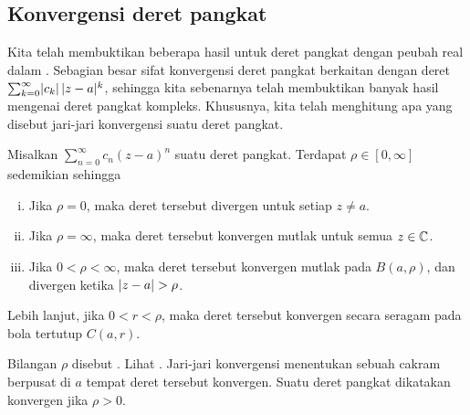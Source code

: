 \subsection{Konvergensi deret pangkat}

Kita telah membuktikan beberapa hasil untuk deret pangkat dengan peubah real dalam
.   Sebagian besar sifat
konvergensi deret pangkat berkaitan dengan deret
$\sum_{k=0}^\infty \lvert {c_k} \rvert \, \lvert {z-a} \rvert^k$,
sehingga kita sebenarnya telah membuktikan banyak hasil mengenai deret pangkat
kompleks.  Khususnya, kita telah menghitung apa yang disebut
jari-jari konvergensi suatu deret pangkat.

\begin{prop}
\pagebreak[2]
Misalkan $\sum_{n=0}^\infty c_n {(z-a)}^n$ suatu deret pangkat.
Terdapat $\rho \in [0,\infty]$ sedemikian sehingga
\begin{enumerate}[(i)]
\item Jika $\rho = 0$, maka deret tersebut divergen untuk setiap $z \neq a$.
\item Jika $\rho = \infty$, maka deret tersebut konvergen mutlak untuk semua $z \in {\mathbb{C}}$.
\item Jika $0 < \rho < \infty$, maka deret tersebut
konvergen mutlak pada $B(a,\rho)$,
dan divergen ketika $\lvert {z-a} \rvert > \rho$.
\end{enumerate}
Lebih lanjut, jika $0 < r < \rho$, maka
deret tersebut konvergen secara seragam pada bola tertutup $C(a,r)$.
\end{prop}

Bilangan $\rho$ disebut \emph{}.
Lihat .
Jari-jari konvergensi menentukan sebuah cakram berpusat di $a$ tempat deret tersebut konvergen.  Suatu deret pangkat
dikatakan konvergen jika $\rho > 0$.
\begin{myfigureht}
\caption{Jari-jari konvergensi.\label{fig:radiusconvcomplex}}
\end{myfigureht}

